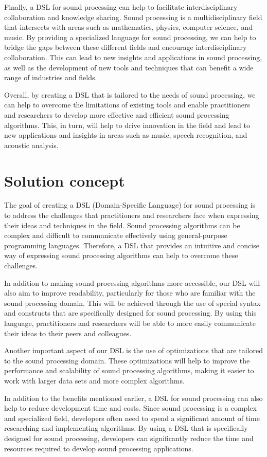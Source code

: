 Finally, a DSL for sound processing can help to facilitate interdisciplinary collaboration and knowledge sharing. Sound processing is a multidisciplinary field that intersects with areas such as mathematics, physics, computer science, and music. By providing a specialized language for sound processing, we can help to bridge the gaps between these different fields and encourage interdisciplinary collaboration. This can lead to new insights and applications in sound processing, as well as the development of new tools and techniques that can benefit a wide range of industries and fields.

Overall, by creating a DSL that is tailored to the needs of sound processing, we can help to overcome the limitations of existing tools and enable practitioners and researchers to develop more effective and efficient sound processing algorithms. This, in turn, will help to drive innovation in the field and lead to new applications and insights in areas such as music, speech recognition, and acoustic analysis.
\section{Solution concept} 
The goal of creating a DSL (Domain-Specific Language) for sound processing is to address the challenges that practitioners and researchers face when expressing their ideas and techniques in the field. Sound processing algorithms can be complex and difficult to communicate effectively using general-purpose programming languages. Therefore, a DSL that provides an intuitive and concise way of expressing sound processing algorithms can help to overcome these challenges.

In addition to making sound processing algorithms more accessible, our DSL will also aim to improve readability, particularly for those who are familiar with the sound processing domain. This will be achieved through the use of special syntax and constructs that are specifically designed for sound processing. By using this language, practitioners and researchers will be able to more easily communicate their ideas to their peers and colleagues.

Another important aspect of our DSL is the use of optimizations that are tailored to the sound processing domain. These optimizations will help to improve the performance and scalability of sound processing algorithms, making it easier to work with larger data sets and more complex algorithms.

In addition to the benefits mentioned earlier, a DSL for sound processing can also help to reduce development time and costs. Since sound processing is a complex and specialized field, developers often need to spend a significant amount of time researching and implementing algorithms. By using a DSL that is specifically designed for sound processing, developers can significantly reduce the time and resources required to develop sound processing applications.

